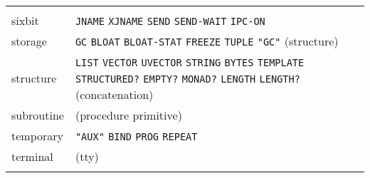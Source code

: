 \documentclass[a4paper,]{article}
\begin{document}
\begin{longtable}[]{@{}ll@{}}
\begin{minipage}[t]{0.83\columnwidth}
\end{minipage}\tabularnewline
\begin{minipage}[t]{0.11\columnwidth}\raggedright\strut
sixbit\strut
\end{minipage} & \begin{minipage}[t]{0.83\columnwidth}\raggedright\strut
\texttt{JNAME} \texttt{XJNAME} \texttt{SEND} \texttt{SEND-WAIT} \texttt{IPC-ON}\strut
\end{minipage}\tabularnewline
\begin{minipage}[t]{0.11\columnwidth}\raggedright\strut
storage\strut
\end{minipage} & \begin{minipage}[t]{0.83\columnwidth}\raggedright\strut
\texttt{GC} \texttt{BLOAT} \texttt{BLOAT-STAT} \texttt{FREEZE} \texttt{TUPLE} \texttt{"GC"} (structure)\strut
\end{minipage}\tabularnewline
\begin{minipage}[t]{0.11\columnwidth}\raggedright\strut
structure\strut
\end{minipage} & \begin{minipage}[t]{0.83\columnwidth}\raggedright\strut
\texttt{LIST} \texttt{VECTOR} \texttt{UVECTOR} \texttt{STRING} \texttt{BYTES} \texttt{TEMPLATE} \texttt{STRUCTURED?}
\texttt{EMPTY?} \texttt{MONAD?} \texttt{LENGTH} \texttt{LENGTH?} (concatenation)\strut
\end{minipage}\tabularnewline
\begin{minipage}[t]{0.11\columnwidth}\raggedright\strut
subroutine\strut
\end{minipage} & \begin{minipage}[t]{0.83\columnwidth}\raggedright\strut
(procedure primitive)\strut
\end{minipage}\tabularnewline
\begin{minipage}[t]{0.11\columnwidth}\raggedright\strut
temporary\strut
\end{minipage} & \begin{minipage}[t]{0.83\columnwidth}\raggedright\strut
\texttt{"AUX"} \texttt{BIND} \texttt{PROG} \texttt{REPEAT}\strut
\end{minipage}\tabularnewline
\begin{minipage}[t]{0.11\columnwidth}\raggedright\strut
terminal\strut
\end{minipage} & \begin{minipage}[t]{0.83\columnwidth}\raggedright\strut
(tty)\strut
\end{minipage}\tabularnewline
\begin{minipage}[t]{0.11\columnwidth}\raggedright\strut

\end{minipage}
\end{longtable}
\end{document}
